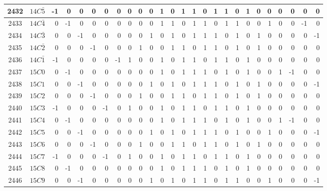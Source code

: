 \documentclass[12 pt]{article}%
\begin{document}
\begin{tiny}
\begin{centering}
\begin{longtable}{|c|c||rrrrrrrrrrrrrrrrrrrrrrrr|}
      \hline
      2432 & $14C\bar5$ & -1 & 0 & 0 & 0 & 0 & 0 & 0 & 0 & 0 & 1 & 0 & 1 & 1 & 0 & 1 & 1 & 0 & 1 & 0 & 0 & 0 & 0 & 0 & 0 \\
      \hline
      2433 & $14C\bar4$ & 0 & -1 & 0 & 0 & 0 & 0 & 0 & 0 & 0 & 1 & 1 & 0 & 1 & 1 & 0 & 1 & 1 & 0 & 0 & 1 & 0 & 0 & -1 & 0 \\
      \hline
      2434 & $14C\bar3$ & 0 & 0 & -1 & 0 & 0 & 0 & 0 & 0 & 1 & 0 & 1 & 0 & 1 & 1 & 1 & 0 & 1 & 0 & 1 & 0 & 0 & 0 & 0 & -1 \\
      \hline
      2435 & $14C\bar2$ & 0 & 0 & 0 & -1 & 0 & 0 & 0 & 1 & 0 & 0 & 1 & 1 & 0 & 1 & 1 & 0 & 1 & 0 & 1 & 0 & 0 & 0 & 0 & 0 \\
      \hline
      2436 & $14C\bar1$ & -1 & 0 & 0 & 0 & 0 & -1 & 1 & 0 & 0 & 1 & 0 & 1 & 1 & 0 & 1 & 1 & 0 & 1 & 0 & 0 & 0 & 0 & 0 & 0 \\
      \hline
      2437 & $15C0$ & 0 & -1 & 0 & 0 & 0 & 0 & 0 & 0 & 0 & 1 & 0 & 1 & 1 & 1 & 0 & 1 & 0 & 1 & 0 & 0 & 1 & -1 & 0 & 0 \\
      \hline
      2438 & $15C1$ & 0 & 0 & -1 & 0 & 0 & 0 & 0 & 0 & 1 & 0 & 1 & 0 & 1 & 1 & 1 & 0 & 1 & 0 & 1 & 0 & 0 & 0 & 0 & -1 \\
      \hline
      2439 & $15C2$ & 0 & 0 & 0 & -1 & 0 & 0 & 0 & 1 & 0 & 0 & 1 & 1 & 0 & 1 & 1 & 0 & 1 & 0 & 1 & 0 & 0 & 0 & 0 & 0 \\
      \hline
      2440 & $15C3$ & -1 & 0 & 0 & 0 & -1 & 0 & 1 & 0 & 0 & 1 & 0 & 1 & 1 & 0 & 1 & 1 & 0 & 1 & 0 & 0 & 0 & 0 & 0 & 0 \\
      \hline
      2441 & $15C4$ & 0 & -1 & 0 & 0 & 0 & 0 & 0 & 0 & 0 & 1 & 0 & 1 & 1 & 1 & 0 & 1 & 0 & 1 & 0 & 0 & 1 & -1 & 0 & 0 \\
      \hline
      2442 & $15C5$ & 0 & 0 & -1 & 0 & 0 & 0 & 0 & 0 & 1 & 0 & 1 & 0 & 1 & 1 & 1 & 0 & 1 & 0 & 0 & 1 & 0 & 0 & 0 & -1 \\
      \hline
      2443 & $15C6$ & 0 & 0 & 0 & -1 & 0 & 0 & 0 & 1 & 0 & 0 & 1 & 1 & 0 & 1 & 1 & 0 & 1 & 0 & 1 & 0 & 0 & 0 & 0 & 0 \\
      \hline
      2444 & $15C7$ & -1 & 0 & 0 & 0 & -1 & 0 & 1 & 0 & 0 & 1 & 0 & 1 & 1 & 0 & 1 & 1 & 0 & 1 & 0 & 0 & 0 & 0 & 0 & 0 \\
      \hline
      2445 & $15C8$ & 0 & -1 & 0 & 0 & 0 & 0 & 0 & 0 & 0 & 1 & 0 & 1 & 1 & 1 & 0 & 1 & 0 & 1 & 0 & 0 & 0 & 0 & 0 & 0 \\
      \hline
      2446 & $15C9$ & 0 & 0 & -1 & 0 & 0 & 0 & 0 & 0 & 1 & 0 & 1 & 0 & 1 & 1 & 0 & 1 & 1 & 0 & 0 & 1 & 0 & 0 & 0 & -1 \\

\end{longtable}
\end{centering}
\end{tiny}
\end{document}
